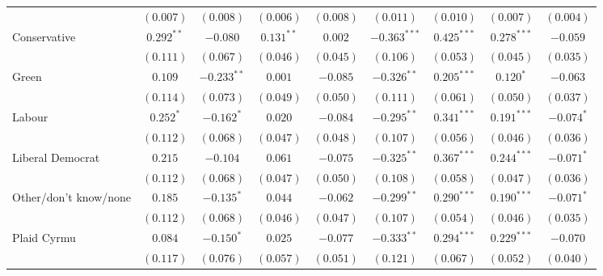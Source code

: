 \documentclass[12pt, letter]{article}
\begin{document}
\begin{table}
\begin{center}
{\begin{tabular}{l c c c c c c c c }
                                 & $(0.007)$      & $(0.008)$      & $(0.006)$      & $(0.008)$      & $(0.011)$      & $(0.010)$      & $(0.007)$      & $(0.004)$      \\
Conservative                     & $0.292^{**}$   & $-0.080$       & $0.131^{**}$   & $0.002$        & $-0.363^{***}$ & $0.425^{***}$  & $0.278^{***}$  & $-0.059$       \\
                                 & $(0.111)$      & $(0.067)$      & $(0.046)$      & $(0.045)$      & $(0.106)$      & $(0.053)$      & $(0.045)$      & $(0.035)$      \\
Green                            & $0.109$        & $-0.233^{**}$  & $0.001$        & $-0.085$       & $-0.326^{**}$  & $0.205^{***}$  & $0.120^{*}$    & $-0.063$       \\
                                 & $(0.114)$      & $(0.073)$      & $(0.049)$      & $(0.050)$      & $(0.111)$      & $(0.061)$      & $(0.050)$      & $(0.037)$      \\
Labour                           & $0.252^{*}$    & $-0.162^{*}$   & $0.020$        & $-0.084$       & $-0.295^{**}$  & $0.341^{***}$  & $0.191^{***}$  & $-0.074^{*}$   \\
                                 & $(0.112)$      & $(0.068)$      & $(0.047)$      & $(0.048)$      & $(0.107)$      & $(0.056)$      & $(0.046)$      & $(0.036)$      \\
Liberal Democrat                 & $0.215$        & $-0.104$       & $0.061$        & $-0.075$       & $-0.325^{**}$  & $0.367^{***}$  & $0.244^{***}$  & $-0.071^{*}$   \\
                                 & $(0.112)$      & $(0.068)$      & $(0.047)$      & $(0.050)$      & $(0.108)$      & $(0.058)$      & $(0.047)$      & $(0.036)$      \\
Other/don't know/none            & $0.185$        & $-0.135^{*}$   & $0.044$        & $-0.062$       & $-0.299^{**}$  & $0.290^{***}$  & $0.190^{***}$  & $-0.071^{*}$   \\
                                 & $(0.112)$      & $(0.068)$      & $(0.046)$      & $(0.047)$      & $(0.107)$      & $(0.054)$      & $(0.046)$      & $(0.035)$      \\
Plaid Cyrmu                      & $0.084$        & $-0.150^{*}$   & $0.025$        & $-0.077$       & $-0.333^{**}$  & $0.294^{***}$  & $0.229^{***}$  & $-0.070$       \\
                                 & $(0.117)$      & $(0.076)$      & $(0.057)$      & $(0.051)$      & $(0.121)$      & $(0.067)$      & $(0.052)$      & $(0.040)$      \\

\end{tabular}}
\end{center}
\end{table}
\end{document}
